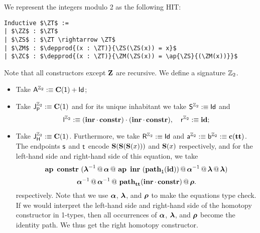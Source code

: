 \begin{example}
\label{ex:mod}
We represent the integers modulo 2 as the following HIT:
\begin{lstlisting}[mathescape=true]
Inductive $\ZT$ :=
| $\ZZ$ : $\ZT$
| $\ZS$ : $\ZT \rightarrow \ZT$
| $\ZM$ : $\depprod{(x : \ZT)}{\ZS(\ZS(x)) = x}$
| $\ZC$ : $\depprod{(x : \ZT)}{\ZM(\ZS(x)) = \ap{\ZS}{(\ZM(x))}}$
\end{lstlisting}
Note that all constructors except $\ZZ$ are recursive.
We define a signature $\ZT$.
\begin{itemize}
	\item Take $\pointconstr[\ZT] \eqdef \sumP{\constantP{\unit}}{\idP}$;
	\item Take $\pathlabel[\ZT] \eqdef \constantP{\unit}$ and for its unique inhabitant we take $\patharg[\ZT] \eqdef \idP$ and
	\[
	\pathleft[\ZT] \eqdef \comp{(\comp{\inre}{\constr})}{(\comp{\inre}{\constr})}, \quad
	\pathright[\ZT] \eqdef \idENA;
	\]
	\item Take $\homotlabel[\ZT] \eqdef \constantP{\unit}$.
	Furthermore, we take $\homotpointarg[\ZT] \eqdef \idP$ and $\pathargleft[\ZT] \eqdef \pathargright[\ZT] \eqdef \Ce(\unitt)$.
	The endpoints $\homotpathleft$ and $\homotpathright$ encode $\ZS(\ZS(\ZS(x)))$ and $\ZS(x)$ respectively,
	and for the left-hand side and right-hand side of this equation, we take
	\[
	\hap{\constr}{(\hconcat{\hinv{\hlunitN}}{\hconcat{\hassocN}{\hconcat{\hap{\inre}{(\hconstr{\unit}{\idENA})}}{\hconcat{\hinv{\hassocN}}{\hconcat{\hlunitN}{\hlunitN}}}}})}
	\]
	\[
	\hconcat{\hinv{\hassocN}}{\hconcat{\hinv{\hassocN}}{\hconcat{\hconstr{\unitt}{\comp{\inre}{\constr}}}{\hrunitN}}}.
	\]
	respectively.
	Note that we use $\hassocN$, $\hlunitN$, and $\hrunitN$ to make the equations type check.
	If we would interpret the left-hand side and right-hand side of  the homotopy constructor in 1-types,
	then all occurrences of $\hassocN$, $\hlunitN$, and $\hrunitN$ become the identity path.
	We thus get the right homotopy constructor.
\end{itemize}
\end{example}

